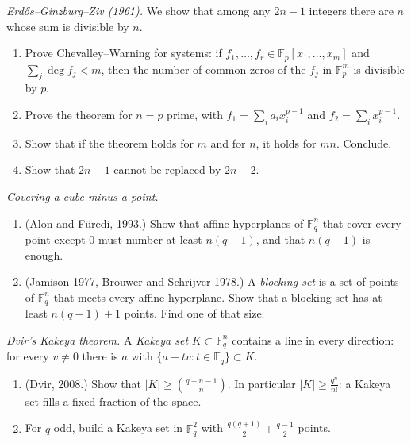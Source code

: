 \begin{exercise}[$\star\star$]\label{pb:egz}
\emph{Erdős--Ginzburg--Ziv (1961).} We show that among any $2n-1$ integers there are $n$ whose sum is divisible by $n$.
\begin{enumerate}[label=(\alph*)]
\item Prove Chevalley--Warning for systems: if $f_1,\dots,f_r\in\mathbb F_p[x_1,\dots,x_m]$ and $\sum_j\deg f_j<m$, then the number
of common zeros of the $f_j$ in $\mathbb F_p^m$ is divisible by $p$.
\item Prove the theorem for $n=p$ prime, with $f_1=\sum_ia_ix_i^{p-1}$ and $f_2=\sum_ix_i^{p-1}$.
\item Show that if the theorem holds for $m$ and for $n$, it holds for $mn$. Conclude.
\item Show that $2n-1$ cannot be replaced by $2n-2$.
\end{enumerate}
\end{exercise}

\begin{exercise}[$\star\star$]\label{pb:hyperplanes}
\emph{Covering a cube minus a point.}
\begin{enumerate}[label=(\alph*)]
\item (Alon and Füredi, 1993.) Show that affine hyperplanes of $\mathbb F_q^n$ that cover every point except $0$ must number at
least $n(q-1)$, and that $n(q-1)$ is enough.
\item (Jamison 1977, Brouwer and Schrijver 1978.) A \emph{blocking set} is a set of points of $\mathbb F_q^n$ that meets every affine
hyperplane. Show that a blocking set has at least $n(q-1)+1$ points. Find one of that size.
\end{enumerate}
\end{exercise}

\begin{exercise}[$\star\star$]\label{pb:kakeya}
\emph{Dvir's Kakeya theorem.} A \emph{Kakeya set} $K\subset\mathbb F_q^n$ contains a line in every direction: for every
$v\ne0$ there is $a$ with $\{a+tv:t\in\mathbb F_q\}\subset K$.
\begin{enumerate}[label=(\alph*)]
\item (Dvir, 2008.) Show that $|K|\ge\binom{q+n-1}n$. In particular $|K|\ge\frac{q^n}{n!}$: a Kakeya set fills a fixed fraction
of the space.
\item For $q$ odd, build a Kakeya set in $\mathbb F_q^2$ with $\frac{q(q+1)}2+\frac{q-1}2$ points.
\end{enumerate}
\end{exercise}

